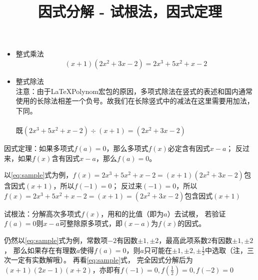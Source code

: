 \documentclass[windows,csize4]{BHCexam}
\title{因式分解 - 试根法，因式定理}
\begin{document}
\maketitle

\begin{groups}
    \begin{itemize}
        \item 整式乘法
              \begin{equation}
                \label{eq:sample}
                  (x+1)(2x^2+3x-2) = 2x^3+5x^2+x-2
              \end{equation}
        \item 整式除法 \\
              注意：由于\LaTeX \quad Polynom宏包的原因，多项式除法在竖式的表述和国内通常使用的长除法相差一个负号。故我们在长除竖式中的减法在这里需要用加法，下同。\\
               \\
              既$(2x^3+5x^2+x-2)\div (x+1)=(2x^2+3x-2)$
    \end{itemize}

    \fbox
    {
        \parbox{\textwidth}
        {
            因式定理：如果多项式$f(a)=0$，那么多项式$f(x)$必定含有因式$x-a$；
            反过来，如果$f(x)$含有因式$x-a$，那么$f(a)=0$。
        }
    }
    以\ref{eq:sample}式为例，$f(x)=2x^3+5x^2+x-2=(x+1)(2x^2+3x-2)$包含因式$(x+1)$，所以$f(-1)=0$；
    反过来$(-1)=0$，所以$f(x)=2x^3+5x^2+x-2=(x+1)=(2x^2+3x-2)$包含因式$(x+1)$

    \fbox
    {
        \parbox{\textwidth}
        {
            试根法：分解高次多项式$f(x)$，用和的比值（即为$a$）去试根，
            若验证$f(a)=0$则$x-a$可整除原多项式，即$(x-a)$为$f(x)$的因式。
        }
    }
    仍然以\ref{eq:sample}式为例，常数项$-2$有因数$\pm 1,\pm 2$，最高此项系数$2$有因数$\pm 1,\pm 2$，
    那么如果存在有理数$a$使得$f(a)=0$，则$a$只可能在$\pm 1, \pm 2, \pm\frac{1}{2}$中选取（注，三次一定有实数解哦）。 
    再看\ref{eq:sample}式， 完全因式分解后为$(x+1)(2x-1)(x+2)$，亦即有$f(-1)=0,f(\frac{1}{2})=0,f(-2)=0$




\end{groups}
\end{document}
